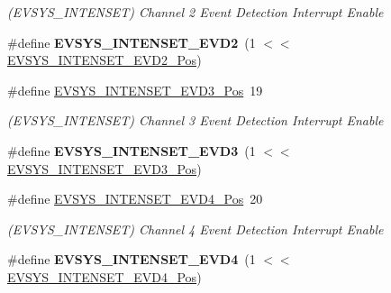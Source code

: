 \begin{DoxyCompactItemize}
\begin{DoxyCompactList}\small\item\em (E\+V\+S\+Y\+S\+\_\+\+I\+N\+T\+E\+N\+S\+E\+T) Channel 2 Event Detection Interrupt Enable \end{DoxyCompactList}\item 
\hypertarget{group___s_a_m_l21___e_v_s_y_s_ga953e215ddeef90d2629f5f5e413d1690}{}\#define {\bfseries E\+V\+S\+Y\+S\+\_\+\+I\+N\+T\+E\+N\+S\+E\+T\+\_\+\+E\+V\+D2}~(1 $<$$<$ \hyperlink{group___s_a_m_l21___e_v_s_y_s_ga542144111fbc105d0a6e2d704883c063}{E\+V\+S\+Y\+S\+\_\+\+I\+N\+T\+E\+N\+S\+E\+T\+\_\+\+E\+V\+D2\+\_\+\+Pos})\label{group___s_a_m_l21___e_v_s_y_s_ga953e215ddeef90d2629f5f5e413d1690}

\item 
\hypertarget{group___s_a_m_l21___e_v_s_y_s_gaac9b840fb3abe73c95259560b1034777}{}\#define \hyperlink{group___s_a_m_l21___e_v_s_y_s_gaac9b840fb3abe73c95259560b1034777}{E\+V\+S\+Y\+S\+\_\+\+I\+N\+T\+E\+N\+S\+E\+T\+\_\+\+E\+V\+D3\+\_\+\+Pos}~19\label{group___s_a_m_l21___e_v_s_y_s_gaac9b840fb3abe73c95259560b1034777}

\begin{DoxyCompactList}\small\item\em (E\+V\+S\+Y\+S\+\_\+\+I\+N\+T\+E\+N\+S\+E\+T) Channel 3 Event Detection Interrupt Enable \end{DoxyCompactList}\item 
\hypertarget{group___s_a_m_l21___e_v_s_y_s_gac9af2c154daf657c25d036857a71fa71}{}\#define {\bfseries E\+V\+S\+Y\+S\+\_\+\+I\+N\+T\+E\+N\+S\+E\+T\+\_\+\+E\+V\+D3}~(1 $<$$<$ \hyperlink{group___s_a_m_l21___e_v_s_y_s_gaac9b840fb3abe73c95259560b1034777}{E\+V\+S\+Y\+S\+\_\+\+I\+N\+T\+E\+N\+S\+E\+T\+\_\+\+E\+V\+D3\+\_\+\+Pos})\label{group___s_a_m_l21___e_v_s_y_s_gac9af2c154daf657c25d036857a71fa71}

\item 
\hypertarget{group___s_a_m_l21___e_v_s_y_s_gaa3e3da85d4913721625700090e5755aa}{}\#define \hyperlink{group___s_a_m_l21___e_v_s_y_s_gaa3e3da85d4913721625700090e5755aa}{E\+V\+S\+Y\+S\+\_\+\+I\+N\+T\+E\+N\+S\+E\+T\+\_\+\+E\+V\+D4\+\_\+\+Pos}~20\label{group___s_a_m_l21___e_v_s_y_s_gaa3e3da85d4913721625700090e5755aa}

\begin{DoxyCompactList}\small\item\em (E\+V\+S\+Y\+S\+\_\+\+I\+N\+T\+E\+N\+S\+E\+T) Channel 4 Event Detection Interrupt Enable \end{DoxyCompactList}\item 
\hypertarget{group___s_a_m_l21___e_v_s_y_s_ga780d95e235193442f64eb7a607097d1c}{}\#define {\bfseries E\+V\+S\+Y\+S\+\_\+\+I\+N\+T\+E\+N\+S\+E\+T\+\_\+\+E\+V\+D4}~(1 $<$$<$ \hyperlink{group___s_a_m_l21___e_v_s_y_s_gaa3e3da85d4913721625700090e5755aa}{E\+V\+S\+Y\+S\+\_\+\+I\+N\+T\+E\+N\+S\+E\+T\+\_\+\+E\+V\+D4\+\_\+\+Pos})\label{group___s_a_m_l21___e_v_s_y_s_ga780d95e235193442f64eb7a607097d1c}


\end{DoxyCompactItemize}
